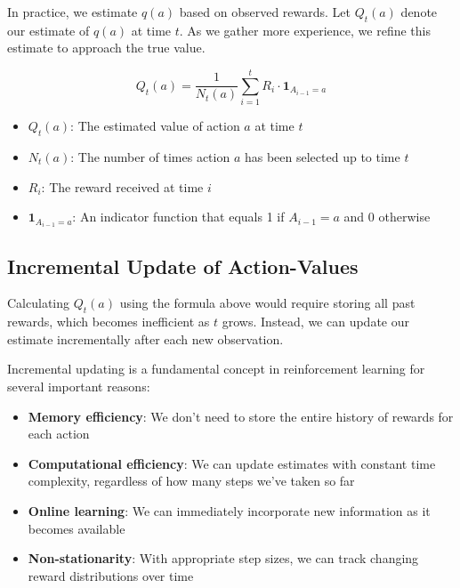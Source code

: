 \documentclass{article}
\begin{document}
In practice, we estimate $q(a)$ based on observed rewards. Let $Q_t(a)$ denote our estimate of $q(a)$ at time $t$. As we gather more experience, we refine this estimate to approach the true value.

\begin{equation}
    Q_t(a) = \frac{1}{N_t(a)} \sum_{i=1}^{t} R_i \cdot \mathbf{1}_{A_{i-1}=a}
\end{equation}

\begin{tcolorbox}[colback=blue!5!white,colframe=blue!75!black,title=Notation Overview]
\begin{itemize}
    \item $Q_t(a)$: The estimated value of action $a$ at time $t$
    \item $N_t(a)$: The number of times action $a$ has been selected up to time $t$
    \item $R_i$: The reward received at time $i$
    \item $\mathbf{1}_{A_{i-1}=a}$: An indicator function that equals 1 if $A_{i-1} = a$ and 0 otherwise
\end{itemize}
\end{tcolorbox}

\subsection{Incremental Update of Action-Values}
Calculating $Q_t(a)$ using the formula above would require storing all past rewards, which becomes inefficient as $t$ grows. Instead, we can update our estimate incrementally after each new observation.

Incremental updating is a fundamental concept in reinforcement learning for several important reasons:

\begin{itemize}
    \item \textbf{Memory efficiency}: We don't need to store the entire history of rewards for each action
    \item \textbf{Computational efficiency}: We can update estimates with constant time complexity, regardless of how many steps we've taken so far
    \item \textbf{Online learning}: We can immediately incorporate new information as it becomes available
    \item \textbf{Non-stationarity}: With appropriate step sizes, we can track changing reward distributions over time
\end{itemize}
\end{document}

